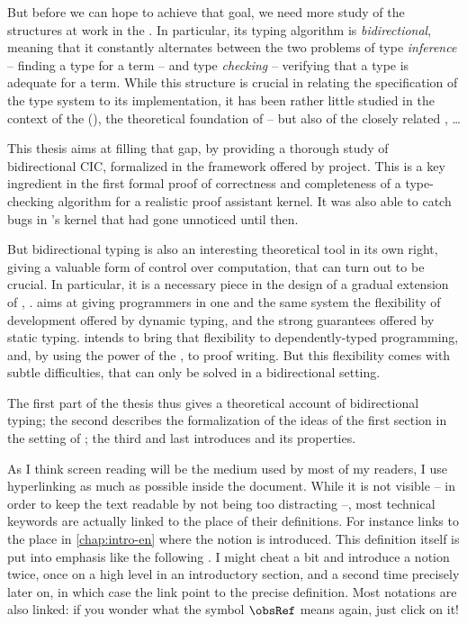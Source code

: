 But before we can hope to achieve that goal, we need more study of the structures at work
in the . In particular, its typing algorithm is \emph{bidirectional}, meaning that
it constantly alternates between the two problems of type \emph{inference} – finding a type for
a term – and type \emph{checking} – verifying that a type is adequate for a term. While this
structure is crucial in relating the specification of the type system to its implementation,
it has been rather little studied in the context of the 
(), the theoretical foundation of  – but also of the closely related
, …

This thesis aims at filling that gap, by providing a thorough study of bidirectional CIC,
formalized in the framework offered by  project. This is a key
ingredient in the first formal proof of correctness and completeness of a type-checking
algorithm for a realistic proof assistant kernel.
It was also able to catch bugs in ’s kernel that had gone unnoticed until then.

But bidirectional typing is also an interesting theoretical tool in its own right,
giving a valuable form of control over computation, that can turn out to be crucial.
In particular, it is a necessary piece in the design of a gradual extension of
, .
 aims at giving programmers in one and the same system the flexibility of
development offered by dynamic typing, and the strong guarantees offered
by static typing.  intends
to bring that flexibility to dependently-typed programming,
and, by using the power of the , to proof writing.
But this flexibility comes with subtle difficulties, that can only be solved in a bidirectional
setting.

The first part of the thesis thus gives a theoretical account of bidirectional typing; the second
describes the formalization of the ideas of the first section in the setting of ;
the third and last introduces  and its properties.



As I think screen reading will be the medium
used by most of my readers, I use hyperlinking as much as possible
inside the document.
While it is not visible – in order to keep the text readable by not being too distracting –,
most technical keywords are actually linked to the
place of their definitions. For instance  links to
the place in \cref{chap:intro-en} where the notion is introduced.
This definition itself is put into emphasis like the following .
I might cheat a bit and introduce a notion twice, once on a high level in an introductory
section, and a second time precisely later on, in which case the link point to the precise
definition. Most notations are also linked: if you wonder what the symbol $\obsRef$
means again, just click on it!

